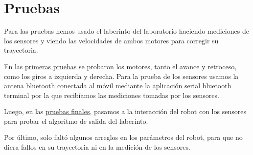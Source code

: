 \chapter{Pruebas}
Para las pruebas hemos usado el laberinto del laboratorio haciendo mediciones de los sensores y viendo las velocidades de ambos motores para corregir su trayectoria.

En las \hyperlink{primerasPruebas}{primeras pruebas} se probaron los motores, tanto el avance y retroceso, como los giros a izquierda y derecha. Para la prueba de los sensores usamos la antena bluetooth conectada al móvil mediante la aplicación serial bluetooth terminal por la que recibíamos las mediciones tomadas por los sensores.

Luego, en las \hyperlink{pruebasFinales}{pruebas finales}, pasamos a la interacción del robot con los sensores para probar el algoritmo de salida del laberinto.

Por último, solo faltó algunos arreglos en los parámetros del robot, para que no diera fallos en su trayectoria ni en la medición de los sensores.